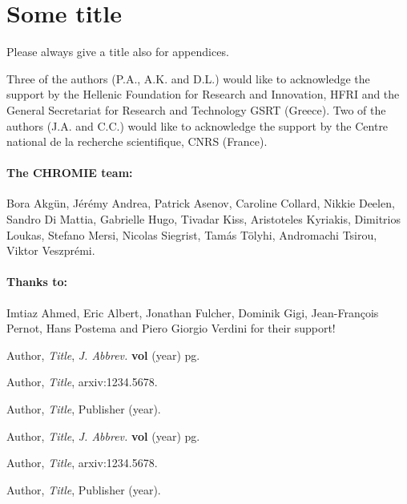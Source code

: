 \documentclass[a4paper,11pt]{article}
\begin{document}
\appendix
\section{Some title}
Please always give a title also for appendices.





\acknowledgments
Three of the authors (P.A., A.K. and D.L.) would like to 
acknowledge the support by the Hellenic Foundation for 
Research and Innovation, HFRI and the General Secretariat for
Research and Technology GSRT (Greece). Two of the authors (J.A. 
and C.C.) would like to acknowledge the support by the Centre 
national de la recherche scientifique, CNRS (France).


\paragraph{The CHROMIE team:} Bora Akg\"un, 
J\'er\'emy Andrea, Patrick Asenov, Caroline Collard, Nikkie Deelen, Sandro Di
Mattia, Gabrielle Hugo, Tivadar Kiss, Aristoteles
Kyriakis, Dimitrios Loukas, Stefano Mersi, Nicolas
Siegrist, Tam\'as T\"olyhi, Andromachi Tsirou, Viktor
Veszpr\'emi.	
\paragraph{Thanks to:} Imtiaz Ahmed, Eric Albert, Jonathan
Fulcher, Dominik Gigi, Jean-Fran\c{c}ois Pernot,
Hans Postema and Piero Giorgio Verdini for their
support!







\begin{thebibliography}{99}
	
Author, \emph{Title}, \emph{J. Abbrev.} {\bf vol} (year) pg.

Author, \emph{Title},
arxiv:1234.5678.

Author, \emph{Title},
Publisher (year).

Author, \emph{Title}, \emph{J. Abbrev.} {\bf vol} (year) pg.

Author, \emph{Title},
arxiv:1234.5678.

Author, \emph{Title},
Publisher (year).





\end{thebibliography}
\end{document}
